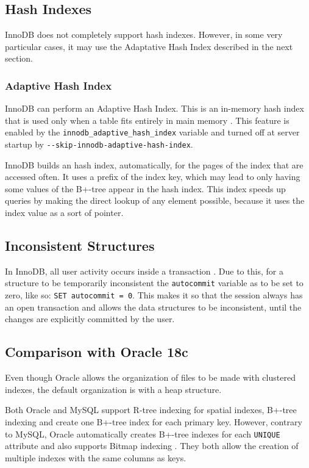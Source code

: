 \documentclass[12pt]{article}
\begin{document}
\subsection{Hash Indexes}
\label{HashIndexes}
InnoDB does not completely support hash indexes. However, in some very particular cases, it may use the Adaptative Hash Index described in the next section.

\subsubsection{Adaptive Hash Index}
\label{adaptativrHashIndex}
InnoDB can perform an Adaptive Hash Index. This is an in-memory hash index that is used only when a table fits entirely in main memory \parencite{AdaptativeHashIndex}. This feature is enabled by the \verb|innodb_adaptive_hash_index| variable and turned off at server startup by \verb|--skip-innodb-adaptive-hash-index|.
 
InnoDB builds an hash index, automatically, for the pages of the index that are accessed often. It uses a prefix of the index key, which may lead to only having some values of the B+-tree appear in the hash index. This index speeds up queries by making the direct lookup of any element possible, because it uses the index value as a sort of pointer.

\subsection{Inconsistent Structures}
\label{InconsistentStructures}
In InnoDB, all user activity occurs inside a transaction \parencite{InnoDBAutocommit}. Due to this, for a structure to be temporarily inconsistent the \verb|autocommit| variable as to be set to zero, like so: \verb|SET autocommit = 0|. This makes it so that the session always has an open transaction and allows the data structures to be inconsistent, until the changes are explicitly committed by the user.


\subsection{Comparison with Oracle 18c}
\label{indexHashComp} 
Even though Oracle allows the organization of files to be made with clustered indexes, the default organization is with a heap structure.

Both Oracle and MySQL support R-tree indexing for spatial indexes, B+-tree indexing and create one B+-tree index for each primary key. However, contrary to MySQL, Oracle automatically creates B+-tree indexes for each \verb|UNIQUE| attribute and also supports Bitmap indexing \parencite{ManagingIndexesOracle}. They both allow the creation of multiple indexes with the same columns as keys.
\end{document}
